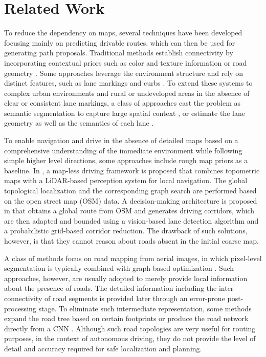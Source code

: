 \documentclass[10pt,twocolumn,letterpaper]{article}
\begin{document}
\section{Related Work}

\label{sect:background}
To reduce the dependency on maps, several techniques have been developed focusing mainly on predicting drivable routes, which can then be used for generating path proposals. Traditional methods establish connectivity by incorporating contextual priors such as color and texture information \cite{kong2010general, chiu2005lane} or road geometry \cite{dickmanns1992recursive, kuhnl2012spatial}. Some approaches leverage the environment structure and rely on distinct features, such as lane markings and curbs \cite{li2016deep, topfer2014efficient, neven2018towards, beck2014non, lee2018development}. To extend these systems to complex urban environments and rural or undeveloped areas in the absence of clear or consistent lane markings, a class of approaches cast the problem as semantic segmentation to capture large spatial context \cite{suleymanov2018inferring, liang2019convolutional, lee2017vpgnet, he2016accurate, barnes2017find}, or estimate the lane geometry as well as the semantics of each lane \cite{meyer2018deep, homayounfar2018hierarchical}.

To enable navigation and drive in the absence of detailed maps based on a comprehensive understanding of the immediate environment while following simple higher level directions, some approaches include rough map priors as a baseline. In \cite{ort2019maplite}, a map-less driving framework is proposed that combines topometric maps with a LiDAR-based perception system for local navigation. The global topological localization and the corresponding graph search are performed based on the open street map (OSM) data. A decision-making architecture is proposed in \cite{artunedo2019decision} that obtains a global route from OSM and generates driving corridors, which are then adapted and bounded using a vision-based lane detection algorithm and a probabilistic grid-based corridor reduction. The drawback of such solutions, however, is that they cannot reason about roads absent in the initial coarse map.

A class of methods focus on road mapping from aerial images, in which pixel-level segmentation is typically combined with graph-based optimization \cite{mnih2010learning, mattyus2017deeproadmapper, marmanis2016semantic}. Such approaches, however, are usually adopted to merely provide local information about the presence of roads. The detailed information including the inter-connectivity of road segments is provided later through an error-prone post-processing stage. To eliminate such intermediate representation, some methods expand the road tree based on certain footprints or produce the road network directly from a CNN \cite{bastani2018roadtracer}. Although such road topologies are very useful for routing purposes, in the context of autonomous driving, they do not provide the level of detail and accuracy required for safe localization and planning.
\end{document}
